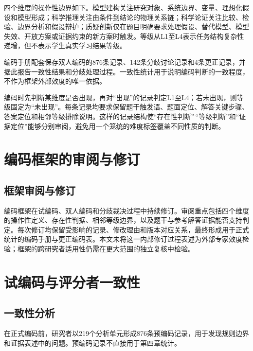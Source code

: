 \documentclass[
  12pt,
  a4paper]{ctexbook}
\begin{document}
四个维度的操作性边界如下。模型建构关注研究对象、系统边界、变量、理想化假设和模型形成；科学推理关注由条件到结论的物理关系链；科学论证关注比较、检验、边界分析和假设辩护；质疑创新仅在题目明确要求处理假设、替代模型、模型失效、开放方案或证据约束的新方案时触发。等级从L1至L4表示任务结构复杂性递增，但不表示学生真实学习结果等级。

编码手册配套保存双人编码的876条记录、142条分歧讨论记录和4条更正记录，并据此报告一致性结果和分歧处理过程。一致性统计用于说明编码判断的一致程度，不作为框架外部效度的唯一依据。

编码时先判断某维度是否出现，再对``出现''的记录判定L1至L4；若未出现，则等级固定为``未出现''。每条记录均要求保留题干触发语、题面定位、解答关键步骤、答案定位和相邻等级排除说明。这样的记录结构使``存在性判断''\,``等级判断''和``证据定位''能够分别审阅，避免用一个笼统的难度标签覆盖不同性质的判断。

\section{编码框架的审阅与修订}\label{ux7f16ux7801ux6846ux67b6ux7684ux5ba1ux9605ux4e0eux4feeux8ba2}

\subsection{框架审阅与修订}\label{ux6846ux67b6ux5ba1ux9605ux4e0eux4feeux8ba2}

编码框架在试编码、双人编码和分歧裁决过程中持续修订。审阅重点包括四个维度的操作性定义、存在性判据、相邻等级边界，以及题干与参考解答证据能否支持判定。每次修订均保留受影响的记录、修改理由和版本对应关系，最终形成用于正式统计的编码手册与更正编码表。本文未将这一内部修订过程表述为外部专家效度检验；框架的跨研究者适用性仍需在更大范围的独立复核中检验。

\section{试编码与评分者一致性}\label{ux8bd5ux7f16ux7801ux4e0eux8bc4ux5206ux8005ux4e00ux81f4ux6027}

\subsection{一致性分析}\label{ux4e00ux81f4ux6027ux5206ux6790}

在正式编码前，研究者以219个分析单元形成876条预编码记录，用于发现规则边界和证据表述中的问题。预编码记录不直接用于第四章统计。
\end{document}

